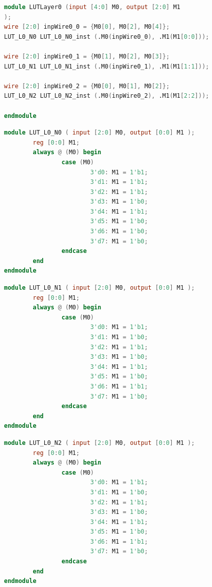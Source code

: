 \begin{lstlisting}[language=Verilog, caption=LUTLayer0.v, label=LUTLayer0v]
module LUTLayer0 (input [4:0] M0, output [2:0] M1
);
wire [2:0] inpWire0_0 = {M0[0], M0[2], M0[4]};
LUT_L0_N0 LUT_L0_N0_inst (.M0(inpWire0_0), .M1(M1[0:0]));

wire [2:0] inpWire0_1 = {M0[1], M0[2], M0[3]};
LUT_L0_N1 LUT_L0_N1_inst (.M0(inpWire0_1), .M1(M1[1:1]));

wire [2:0] inpWire0_2 = {M0[0], M0[1], M0[2]};
LUT_L0_N2 LUT_L0_N2_inst (.M0(inpWire0_2), .M1(M1[2:2]));

endmodule
\end{lstlisting}

\begin{lstlisting}[language=Verilog, caption=LUTL0N0.v, label=LUTL0N0v]
module LUT_L0_N0 ( input [2:0] M0, output [0:0] M1 );
        reg [0:0] M1;
        always @ (M0) begin
                case (M0)
                        3'd0: M1 = 1'b1;
                        3'd1: M1 = 1'b1;
                        3'd2: M1 = 1'b1;
                        3'd3: M1 = 1'b0;
                        3'd4: M1 = 1'b1;
                        3'd5: M1 = 1'b0;
                        3'd6: M1 = 1'b0;
                        3'd7: M1 = 1'b0;
                endcase
        end
endmodule
\end{lstlisting}

\begin{lstlisting}[language=Verilog, caption=LUTL0N1.v, label=LUTL0N1v]
module LUT_L0_N1 ( input [2:0] M0, output [0:0] M1 );
        reg [0:0] M1;
        always @ (M0) begin
                case (M0)
                        3'd0: M1 = 1'b1;
                        3'd1: M1 = 1'b0;
                        3'd2: M1 = 1'b1;
                        3'd3: M1 = 1'b0;
                        3'd4: M1 = 1'b1;
                        3'd5: M1 = 1'b0;
                        3'd6: M1 = 1'b1;
                        3'd7: M1 = 1'b0;
                endcase
        end
endmodule
\end{lstlisting}

\begin{lstlisting}[language=Verilog, caption=LUTL0N2.v, label=LUTL0N2v]
module LUT_L0_N2 ( input [2:0] M0, output [0:0] M1 );
        reg [0:0] M1;
        always @ (M0) begin
                case (M0)
                        3'd0: M1 = 1'b1;
                        3'd1: M1 = 1'b0;
                        3'd2: M1 = 1'b1;
                        3'd3: M1 = 1'b0;
                        3'd4: M1 = 1'b1;
                        3'd5: M1 = 1'b0;
                        3'd6: M1 = 1'b1;
                        3'd7: M1 = 1'b0;
                endcase
        end
endmodule
\end{lstlisting}

